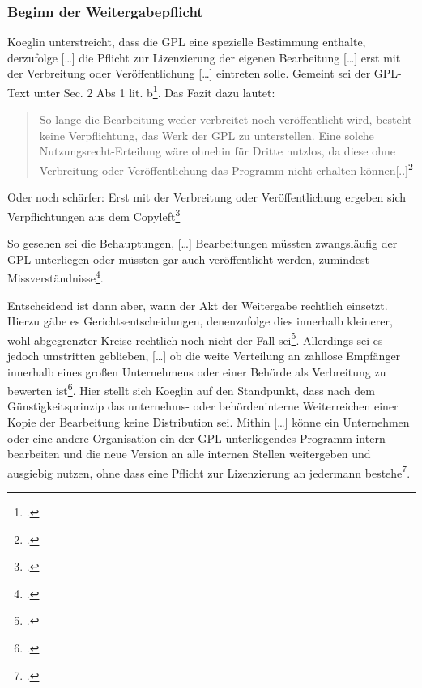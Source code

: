 \documentclass[DIV=calc,BCOR=5mm,11pt,headings=small,oneside,abstract=true, toc=bib]{scrartcl}
\begin{document}
\subsubsection{Beginn der Weitergabepflicht}

Koeglin unterstreicht, dass die GPL eine \glqq{}spezielle Bestimmung\grqq{}
enthalte, derzufolge \glqq{}[\ldots] die Pflicht zur Lizenzierung der
eigenen Bearbeitung [\ldots] erst mit der Verbreitung oder
Veröffentlichung [\ldots] eintreten solle\grqq{}. Gemeint sei der GPL-Text unter
Sec. 2 Abs 1 lit. b\footcite[vgl.][208]{Koglin2007a}. Das Fazit dazu lautet:

\begin{quote}\glqq{}So lange die Bearbeitung weder verbreitet noch
veröffentlicht wird, besteht keine Verpflichtung, das Werk der GPL zu
unterstellen. Eine solche Nutzungsrecht-Erteilung wäre ohnehin für Dritte
nutzlos, da diese ohne Verbreitung oder Veröffentlichung das Programm nicht
erhalten können[..]\grqq{}\footcite[][209]{Koglin2007a}
\end{quote}

Oder noch schärfer: \glqq{}Erst mit der Verbreitung oder Veröffentlichung
ergeben sich Verpflichtungen aus dem
Copyleft\grqq{}\footcite[][211]{Koglin2007a}

So gesehen sei die Behauptungen, \glqq{}[\ldots] Bearbeitungen müssten
zwangsläufig der GPL unterliegen\grqq{} oder müssten gar auch veröffentlicht
werden, zumindest Missverständnisse\footcite[][209]{Koglin2007a}.

Entscheidend ist dann aber, wann der Akt der Weitergabe rechtlich einsetzt.
Hierzu gäbe es Gerichtsentscheidungen, denenzufolge dies innerhalb kleinerer,
wohl abgegrenzter Kreise rechtlich noch nicht der Fall
sei\footcite[vgl.][211]{Koglin2007a}. Allerdings sei es jedoch
\glqq{}umstritten\grqq{} geblieben, \glqq{}[\ldots] ob die weite
Verteilung an zahllose Empfänger innerhalb eines großen Unternehmens oder
einer Behörde als Verbreitung zu bewerten
ist\grqq{}\footcite[vgl.][211]{Koglin2007a}. Hier stellt sich Koeglin auf den
Standpunkt, dass nach dem Günstigkeitsprinzip das \glqq{}unternehms- oder
behördeninterne Weiterreichen einer Kopie der Bearbeitung\grqq{} keine
Distribution sei. Mithin \glqq{}[\ldots] könne ein Unternehmen oder eine
andere Organisation ein der GPL unterliegendes Programm intern bearbeiten
und die neue Version an alle internen Stellen weitergeben und ausgiebig
nutzen, ohne dass eine Pflicht zur Lizenzierung an jedermann
bestehe\grqq{}\footcite[vgl.][212]{Koglin2007a}.
\end{document}
